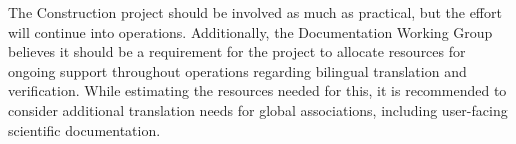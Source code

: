 The Construction project should be involved as much as practical, but the effort will continue into operations.
Additionally, the Documentation Working Group believes it should be a requirement for the project to allocate resources for ongoing support throughout operations regarding bilingual translation and verification.
While estimating the resources needed for this, it is recommended to consider additional translation needs for global associations, including user-facing scientific documentation.
